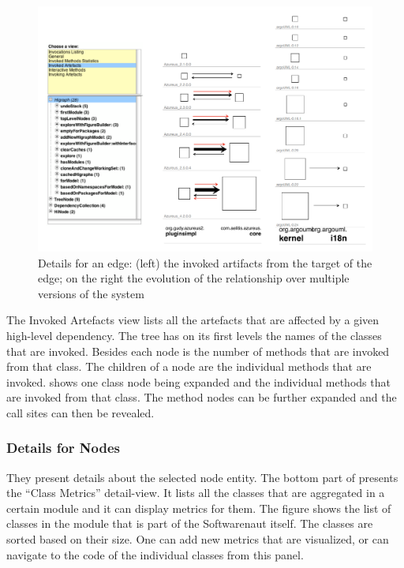 \documentclass[preprint,12pt]{elsarticle}
\begin{document}
\begin{figure}[h]
\begin{center}
\includegraphics[width=0.8\linewidth]{images/DetailsForEdge}
\caption{Details for an edge: (left) the invoked artifacts from the target of the edge; on the right the evolution of the relationship over multiple versions of the system}
\end{center}
\end{figure}
The Invoked Artefacts view lists all the artefacts that are affected by a given high-level dependency. The tree has on its first levels the names of the classes that are invoked. Besides each node is the number of methods that are invoked from that class. The children of a node are the individual methods that are invoked.  shows one class node being expanded and the individual methods that are invoked from that class. The method nodes can be further expanded and the call sites can then be revealed. 


\subsubsection {Details for Nodes}

They present details about the selected node entity. The bottom part of  presents the “Class Metrics” detail-view. It lists all the classes that are aggregated in a certain module and it can display metrics for them. The figure shows the list of classes in the  module that is part of the Softwarenaut itself. The classes are sorted based on their size. One can add new metrics that are visualized, or can navigate to the code of the individual classes from this panel.
\end{document}
